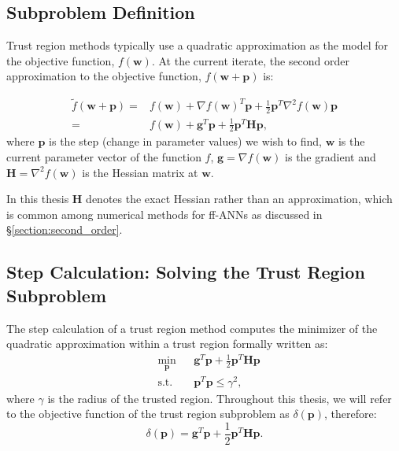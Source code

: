 \documentclass[letterpaper,12pt,titlepage,oneside,final]{book}
\begin{document}
	\subsection{Subproblem Definition}
	
	Trust region methods typically use a quadratic approximation as the model for the objective function, $f(\mathbf{w})$. At the current iterate, the second order approximation to the objective function, $f(\mathbf{w} + \mathbf{p})$ is:
	
	\begin{equation}
	\begin{split}
	\tilde{f}(\mathbf{w} + \mathbf{p}) =  &f(\mathbf{w}) + \nabla f(\mathbf{w})^{T}\mathbf{p} + \frac{1}{2}\mathbf{p}^{T}\nabla^{2} f(\mathbf{w})\mathbf{p} \\
	= & f(\mathbf{w}) + \mathbf{g}^{T}\mathbf{p} + \frac{1}{2}\mathbf{p}^{T}\mathbf{H}\mathbf{p}, 
	\end{split}
	\label{equation:taylor_series}
	\end{equation}
	where $\mathbf{p}$ is the step (change in parameter values) we wish to find, $\mathbf{w}$ is the current parameter vector of the function $f$, $\mathbf{g}=\nabla f(\mathbf{w})$ is the gradient and $\mathbf{H}= \nabla^{2} f(\mathbf{w})$ is the Hessian matrix at $\mathbf{w}$. 
	
	In this thesis $\mathbf{H}$ denotes the exact Hessian rather than an approximation, which is common among numerical methods for ff-ANNs as discussed in \S{\ref{section:second_order}}. 
	
	\subsection{Step Calculation: Solving the Trust Region Subproblem}
	
	The step calculation of a trust region method computes the minimizer of the quadratic approximation within a trust region \cite{TRM.book} formally written as:
	\begin{equation}
	\begin{aligned}
	& \underset{\mathbf{p}}{\text{min}}
	& & \mathbf{g}^{T}\mathbf{p} + \frac{1}{2}\mathbf{p}^{T}\mathbf{Hp} \\
	& \text{s.t.}
	& & \mathbf{p}^{T}\mathbf{p} \leq \gamma^{2},
	\label{equation:TRS}
	\end{aligned}
	\end{equation}
	where $\gamma$ is the radius of the trusted region. Throughout this thesis, we will refer to the objective function of the trust region subproblem as $\delta(\mathbf{p})$, therefore:
	\begin{equation}
	\delta(\mathbf{p}) = \mathbf{g}^{T}\mathbf{p} + \frac{1}{2}\mathbf{p}^{T}\mathbf{Hp}.
	\label{equation:delta}
	\end{equation}
	
\end{document}
